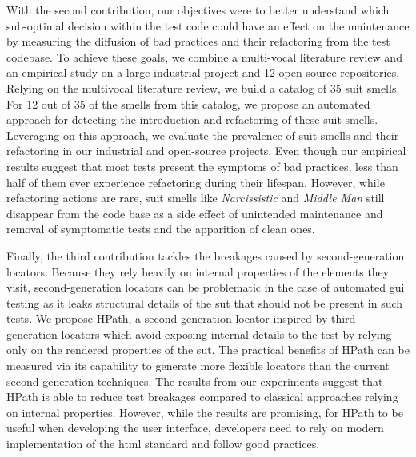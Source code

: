 
With the second contribution, our objectives were to better understand which sub-optimal decision within the test code could have an effect on the maintenance by measuring the diffusion of bad practices and their refactoring from the test codebase. To achieve these goals, we combine a multi-vocal literature review and an empirical study on a large industrial project and 12 open-source repositories.
Relying on the multivocal literature review, we build a catalog of 35 \gls{suit} smells. For 12 out of 35 of the smells from this catalog, we propose an automated approach for detecting the introduction and refactoring of these \gls{suit} smells. Leveraging on this approach, we evaluate the prevalence of \gls{suit} smells and their refactoring in our industrial and open-source projects. Even though our empirical results suggest that most tests present the symptoms of bad practices, less than half of them ever experience refactoring during their lifespan. However, while refactoring actions are rare, \gls{suit} smells like \emph{Narcissistic} and \emph{Middle Man} still disappear from the code base as a side effect of unintended maintenance and removal of symptomatic tests and the apparition of clean ones.

Finally, the third contribution tackles the breakages caused by second-generation locators. Because they rely heavily on internal properties of the elements they visit, second-generation locators can be problematic in the case of automated \gls{gui} testing as it leaks structural details of the \gls{sut} that should not be present in such tests. We propose HPath, a second-generation locator inspired by third-generation locators which avoid exposing internal details to the test by relying only on the rendered properties of the \gls{sut}. The practical benefits of HPath can be measured via its capability to generate more flexible locators than the current second-generation techniques. The results from our experiments suggest that HPath is able to reduce test breakages compared to classical approaches relying on internal properties. However, while the results are promising, for HPath to be useful when developing the user interface, developers need to rely on modern implementation of the \gls{html} standard and follow good practices.

